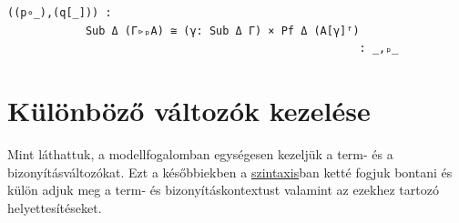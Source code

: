 \begin{code}
\AgdaSymbol{:}\AgdaSpace{}%
\AgdaSpace{}%
\AgdaSpace{}%
\AgdaSymbol{(}\AgdaSpace{}%
\AgdaOperator{\AgdaField{[}}\AgdaSpace{}%
\AgdaSpace{}%
\AgdaOperator{\AgdaField{]ᶠ}}\AgdaSymbol{)\}}\AgdaSpace{}%
\AgdaSpace{}%
\AgdaSpace{}%
\AgdaSpace{}%
\AgdaSymbol{(}\AgdaSpace{}%
\AgdaSpace{}%
\AgdaSymbol{)}\AgdaSpace{}%
\AgdaSpace{}%
\<%
\\
%
\>[6]%
\>[11]\AgdaSymbol{:}%
\>[433I]\AgdaSpace{}%
\AgdaSymbol{\{}\AgdaSpace{}%
\AgdaSpace{}%
\AgdaSymbol{\}\{}\AgdaSpace{}%
\AgdaSymbol{:}\AgdaSpace{}%
\AgdaSpace{}%
\AgdaSpace{}%
\AgdaSymbol{(}\AgdaSpace{}%
\AgdaSpace{}%
\AgdaSymbol{)\}}\<%
\\
\>[.][@{}l@{}]\<[433I]%
\>[13]\AgdaSpace{}%
\AgdaSpace{}%
\AgdaSpace{}%
\AgdaSymbol{(}\AgdaSpace{}%
\AgdaSpace{}%
\AgdaSpace{}%
\AgdaSpace{}%
\AgdaSpace{}%
\AgdaSymbol{(}\AgdaSpace{}%
\AgdaSymbol{)}\AgdaSpace{}%
\AgdaSymbol{(}\AgdaSpace{}%
\AgdaSymbol{)}\AgdaSpace{}%
\AgdaSymbol{(}\AgdaSpace{}%
\AgdaOperator{\AgdaField{[}}\AgdaSpace{}%
\AgdaSpace{}%
\AgdaOperator{\AgdaField{]ᵖ}}\AgdaSymbol{))}\<%
\end{code}

\begin{verbatim}
((p∘_),(q[_])) :
            Sub Δ (Γ▹ₚA) ≅ (γ: Sub Δ Γ) × Pf Δ (A[γ]ᶠ)
                                                      : _,ₚ_
\end{verbatim}

\section{Különböző változók kezelése}

Mint láthattuk, a modellfogalomban egységesen kezeljük a term- és a bizonyításváltozókat. Ezt a későbbiekben a \hyperref[ch:syntax]{szintaxis}ban ketté fogjuk bontani és külön adjuk meg a term- és bizonyításkontextust valamint az ezekhez tartozó helyettesítéseket.


